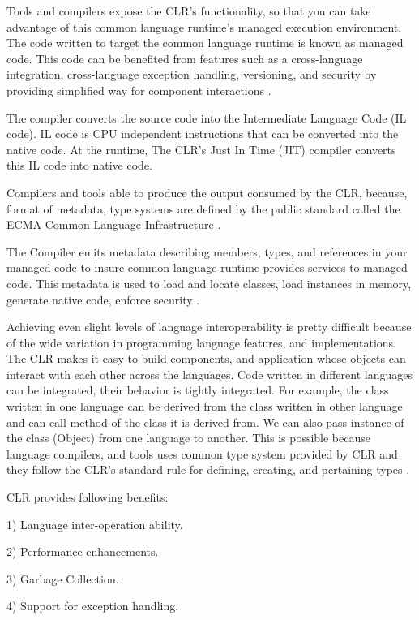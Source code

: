 Tools and compilers expose the CLR's functionality, so that you can take advantage of this common language runtime's managed execution environment. The code written to target the common language runtime is known as managed code. This code can be benefited from features such as a cross-language integration, cross-language exception handling, versioning, and security by providing simplified way for component interactions \cite{commonlanguageruntime}.

The compiler converts the source code into the Intermediate Language Code (IL code). IL code is CPU independent instructions that can be converted into the native code. At the runtime, The CLR's Just In Time (JIT) compiler converts this IL code into native code.

Compilers and tools able to produce the output consumed by the CLR, because, format of metadata, type systems are defined by the public standard called the ECMA Common Language Infrastructure \cite{Gough:2001:CNC:559569}.

The Compiler emits metadata describing members, types, and references in your managed code to insure common language runtime provides services to managed code. This metadata is used to load and locate classes, load instances in memory, generate native code, enforce security \cite{Gough:2001:CNC:559569}.

Achieving even slight levels of language interoperability is pretty difficult because of the wide variation in programming language features, and implementations. The CLR makes it easy to build components, and application whose objects can interact with each other across the languages. Code written in different languages can be integrated, their behavior is tightly integrated. For example, the class written in one language can be derived from the class written in other language and can call method of the class it is derived from. We can also pass instance of the class (Object) from one language to another. This is possible because language compilers, and tools uses common type system provided by CLR and they follow the CLR’s standard rule for defining, creating, and pertaining types \cite{Kennedy:2001:DIG:381694.378797}.


CLR provides following benefits: 

1) Language inter-operation ability.

2) Performance enhancements.

3) Garbage Collection.

4) Support for exception handling.

